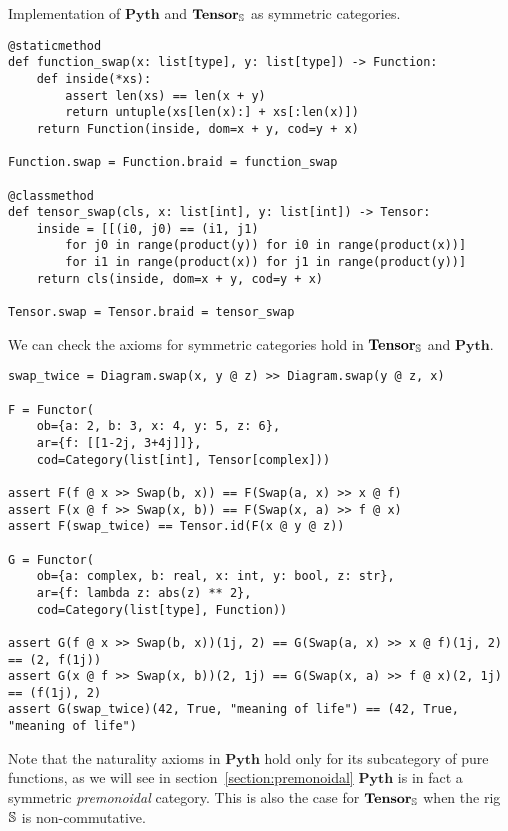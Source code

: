 \begin{python}
{\normalfont Implementation of $\mathbf{Pyth}$ and $\mathbf{Tensor}_\S$ as symmetric categories.}

\begin{verbatim}
@staticmethod
def function_swap(x: list[type], y: list[type]) -> Function:
    def inside(*xs):
        assert len(xs) == len(x + y)
        return untuple(xs[len(x):] + xs[:len(x)])
    return Function(inside, dom=x + y, cod=y + x)

Function.swap = Function.braid = function_swap

@classmethod
def tensor_swap(cls, x: list[int], y: list[int]) -> Tensor:
    inside = [[(i0, j0) == (i1, j1)
        for j0 in range(product(y)) for i0 in range(product(x))]
        for i1 in range(product(x)) for j1 in range(product(y))]
    return cls(inside, dom=x + y, cod=y + x)

Tensor.swap = Tensor.braid = tensor_swap
\end{verbatim}
\end{python}

\begin{example}
We can check the axioms for symmetric categories hold in $\mathbf{Tensor}_\S$ and $\mathbf{Pyth}$.

\begin{verbatim}
swap_twice = Diagram.swap(x, y @ z) >> Diagram.swap(y @ z, x)

F = Functor(
    ob={a: 2, b: 3, x: 4, y: 5, z: 6},
    ar={f: [[1-2j, 3+4j]]},
    cod=Category(list[int], Tensor[complex]))

assert F(f @ x >> Swap(b, x)) == F(Swap(a, x) >> x @ f)
assert F(x @ f >> Swap(x, b)) == F(Swap(x, a) >> f @ x)
assert F(swap_twice) == Tensor.id(F(x @ y @ z))

G = Functor(
    ob={a: complex, b: real, x: int, y: bool, z: str},
    ar={f: lambda z: abs(z) ** 2},
    cod=Category(list[type], Function))

assert G(f @ x >> Swap(b, x))(1j, 2) == G(Swap(a, x) >> x @ f)(1j, 2) == (2, f(1j))
assert G(x @ f >> Swap(x, b))(2, 1j) == G(Swap(x, a) >> f @ x)(2, 1j) == (f(1j), 2)
assert G(swap_twice)(42, True, "meaning of life") == (42, True, "meaning of life")
\end{verbatim}
\end{example}

\begin{remark}
Note that the naturality axioms in $\mathbf{Pyth}$ hold only for its subcategory of pure functions, as we will see in section~\ref{section:premonoidal} $\mathbf{Pyth}$ is in fact a symmetric \emph{premonoidal} category.
This is also the case for $\mathbf{Tensor}_\S$ when the rig $\S$ is non-commutative.
\end{remark}


